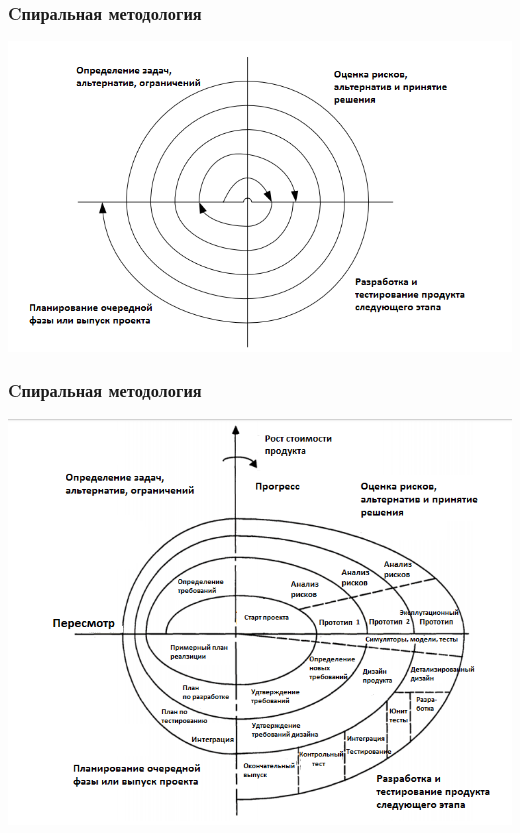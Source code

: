 \documentclass{../industrial-development}
\begin{document}
\begin{frame} \frametitle{Cпиральная методология}
  \centerline{\includegraphics[height=0.9\textheight]{s2.png}}
\end{frame}


\begin{frame} \frametitle{Cпиральная методология}
  \centerline{\includegraphics[height=0.80\textheight]{s3.png}}
\end{frame}
\end{document}
